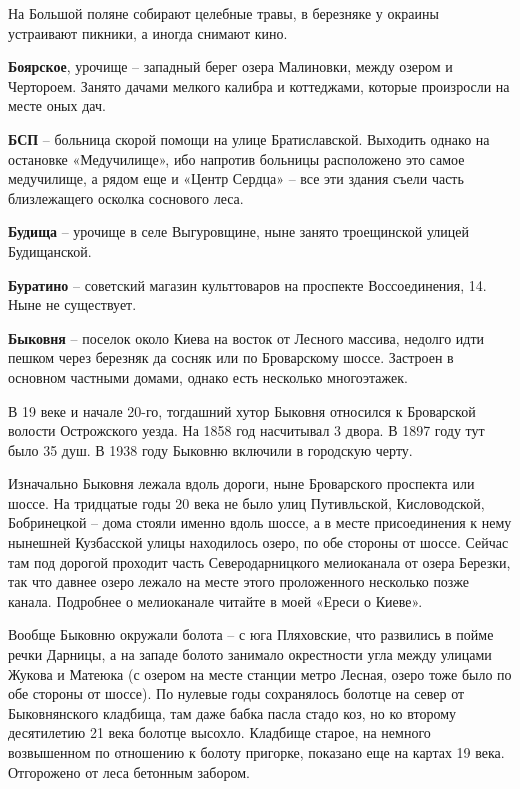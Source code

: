 На Большой поляне собирают целебные травы, в березняке у окраины устраивают пикники, а иногда снимают кино.\\

\medskip

\textbf{Боярское}, урочище – западный берег озера Малиновки, между озером и Чертороем. Занято дачами мелкого калибра и коттеджами, которые произросли на месте оных дач.\\

\medskip


\textbf{БСП} – больница скорой помощи на улице Братиславской. Выходить однако на остановке «Медучилище», ибо напротив больницы расположено это самое медучилище, а рядом еще и «Центр Сердца» – все эти здания съели часть близлежащего осколка соснового леса.\\

\medskip

\textbf{Будища} – урочище в селе Выгуровщине, ныне занято троещинской улицей Будищанской.\\

\medskip

\textbf{Буратино} – советский магазин культтоваров на проспекте Воссоединения, 14. Ныне не существует.\\

\medskip

\textbf{Быковня} – поселок около Киева на восток от Лесного массива, недолго идти пешком через березняк да сосняк или по Броварскому шоссе. Застроен в основном частными домами, однако есть несколько многоэтажек.

В 19 веке и начале 20-го, тогдашний хутор Быковня относился к Броварской волости Ост\-рожского уезда. На 1858 год насчитывал 3 двора. В 1897 году тут было 35 душ. В 1938 году Быковню включили в городскую черту.
 
Изначально Быковня лежала вдоль дороги, ныне Броварского проспекта или шоссе. На тридцатые годы 20 века не было улиц Путивльской, Кисловодской, Бобринецкой – дома стояли именно вдоль шоссе, а в месте присоединения к нему нынешней Кузбасской улицы находилось озеро, по обе стороны от шоссе. Сейчас там под дорогой проходит часть Северодарницкого мелиоканала от озера Березки, так что давнее озеро лежало на месте этого проложенного несколько позже канала. Подробнее о мелиоканале читайте в моей «Ереси о Киеве».
   
Вообще Быковню окружали болота – с юга Пляховские, что развились в пойме речки Дарницы, а на западе болото занимало окрестности угла между улицами Жукова и Матеюка (с озером на месте станции метро Лесная, озеро тоже было по обе стороны от шоссе). По нулевые годы сохранялось болотце на север от Быковнянского кладбища, там даже бабка пасла стадо коз, но ко второму десятилетию 21 века болотце высохло. Кладбище старое, на немного возвышенном по отношению к болоту пригорке, показано еще на картах 19 века. Отгорожено от леса бетонным забором.

